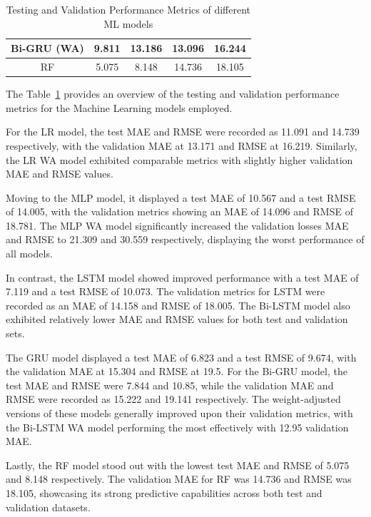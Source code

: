 \begin{table}[p]
\begin{center}
\begin{tabular}{ |c|c|c|c|c| }
            \hline
            Bi-GRU (WA)  & 9.811                     & 13.186                     & \cellcolor{green!20}13.096 & \cellcolor{green!20}16.244 \\
            \hline
            RF           & \cellcolor{green!30}5.075 & \cellcolor{green!30}8.148  & 14.736                     & 18.105                     \\
            \hline
        \end{tabular}
    \end{center}
    \captionsetup{format=plain, justification=centering, font=small}
    \caption{Testing and Validation Performance Metrics of different ML models}
    \label{tab:test_validate_rmse_mae}
\end{table}

The Table~\ref{tab:test_validate_rmse_mae} provides an overview of the testing and validation performance metrics for the Machine Learning models employed.

For the LR model, the test MAE and RMSE were recorded as 11.091 and 14.739 respectively, with the validation MAE at 13.171 and RMSE at 16.219.
Similarly, the LR WA model exhibited comparable metrics with slightly higher validation MAE and RMSE values.

Moving to the MLP model, it displayed a test MAE of 10.567 and a test RMSE of 14.005, with the validation metrics showing an MAE of 14.096 and RMSE of 18.781.
The MLP WA model significantly increased the validation losses MAE and RMSE to 21.309 and 30.559 respectively, displaying the worst performance of all models.

In contrast, the LSTM model showed improved performance with a test MAE of 7.119 and a test RMSE of 10.073.
The validation metrics for LSTM were recorded as an MAE of 14.158 and RMSE of 18.005.
The Bi-LSTM model also exhibited relatively lower MAE and RMSE values for both test and validation sets.

The GRU model displayed a test MAE of 6.823 and a test RMSE of 9.674, with the validation MAE at 15.304 and RMSE at 19.5.
For the Bi-GRU model, the test MAE and RMSE were 7.844 and 10.85, while the validation MAE and RMSE were recorded as 15.222 and 19.141 respectively.
The weight-adjusted versions of these models generally improved upon their validation metrics, with the Bi-LSTM WA model performing the most effectively with 12.95 validation MAE\@.

Lastly, the RF model stood out with the lowest test MAE and RMSE of 5.075 and 8.148 respectively.
The validation MAE for RF was 14.736 and RMSE was 18.105, showcasing its strong predictive capabilities across both test and validation datasets.

